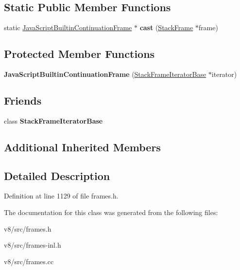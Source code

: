 \subsection*{Static Public Member Functions}
\begin{DoxyCompactItemize}
\item 
\mbox{\label{classv8_1_1internal_1_1JavaScriptBuiltinContinuationFrame_a59def5b5596dd7aced2cd18f85e303e9}} 
static \mbox{\hyperlink{classv8_1_1internal_1_1JavaScriptBuiltinContinuationFrame}{Java\+Script\+Builtin\+Continuation\+Frame}} $\ast$ {\bfseries cast} (\mbox{\hyperlink{classv8_1_1internal_1_1StackFrame}{Stack\+Frame}} $\ast$frame)
\end{DoxyCompactItemize}
\subsection*{Protected Member Functions}
\begin{DoxyCompactItemize}
\item 
\mbox{\label{classv8_1_1internal_1_1JavaScriptBuiltinContinuationFrame_a6cb057312b8cebdf0d34bd8abdf8c8c5}} 
{\bfseries Java\+Script\+Builtin\+Continuation\+Frame} (\mbox{\hyperlink{classv8_1_1internal_1_1StackFrameIteratorBase}{Stack\+Frame\+Iterator\+Base}} $\ast$iterator)
\end{DoxyCompactItemize}
\subsection*{Friends}
\begin{DoxyCompactItemize}
\item 
\mbox{\label{classv8_1_1internal_1_1JavaScriptBuiltinContinuationFrame_ac7310421866976ca454bbe11c5f926c3}} 
class {\bfseries Stack\+Frame\+Iterator\+Base}
\end{DoxyCompactItemize}
\subsection*{Additional Inherited Members}


\subsection{Detailed Description}


Definition at line 1129 of file frames.\+h.



The documentation for this class was generated from the following files\+:\begin{DoxyCompactItemize}
\item 
v8/src/frames.\+h\item 
v8/src/frames-\/inl.\+h\item 
v8/src/frames.\+cc\end{DoxyCompactItemize}
